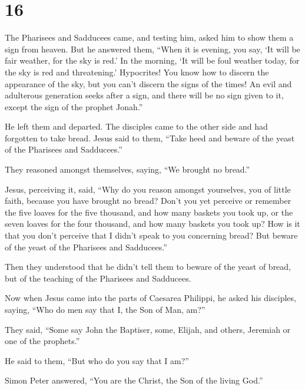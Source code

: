 \hypertarget{section-15}{%
\section{16}\label{section-15}}

 The Pharisees and Sadducees came, and testing him, asked
him to show them a sign from heaven.  But he answered
them, ``When it is evening, you say, `It will be fair weather, for the
sky is red.'  In the morning, `It will be foul weather
today, for the sky is red and threatening.' Hypocrites! You know how to
discern the appearance of the sky, but you can't discern the signs of
the times!  An evil and adulterous generation seeks after
a sign, and there will be no sign given to it, except the sign of the
prophet Jonah.''

He left them and departed.  The disciples came to the
other side and had forgotten to take bread.  Jesus said to
them, ``Take heed and beware of the yeast of the Pharisees and
Sadducees.''

 They reasoned amongst themselves, saying, ``We brought no
bread.''

 Jesus, perceiving it, said, ``Why do you reason amongst
yourselves, you of little faith, because you have brought no bread?
 Don't you yet perceive or remember the five loaves for
the five thousand, and how many baskets you took up,  or
the seven loaves for the four thousand, and how many baskets you took
up?  How is it that you don't perceive that I didn't
speak to you concerning bread? But beware of the yeast of the Pharisees
and Sadducees.''

 Then they understood that he didn't tell them to beware
of the yeast of bread, but of the teaching of the Pharisees and
Sadducees.

 Now when Jesus came into the parts of Caesarea Philippi,
he asked his disciples, saying, ``Who do men say that I, the Son of Man,
am?''

 They said, ``Some say John the Baptiser, some, Elijah,
and others, Jeremiah or one of the prophets.''

 He said to them, ``But who do you say that I am?''

 Simon Peter answered, ``You are the Christ, the Son of
the living God.''

